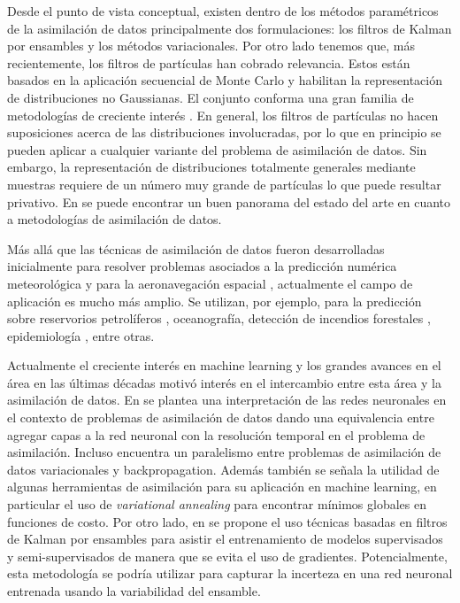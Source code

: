 Desde el punto de vista conceptual, existen dentro de los métodos paramétricos de la asimilación de datos principalmente dos formulaciones: los filtros de Kalman por ensambles y los métodos variacionales. Por otro lado tenemos que, más recientemente, los filtros de partículas han cobrado relevancia. Estos están basados en la aplicación secuencial de Monte Carlo y habilitan la representación de distribuciones no Gaussianas. El conjunto conforma una gran familia de metodologías de creciente interés \citep{vanLeeuwen2019}. En general, los filtros de partículas no hacen suposiciones acerca de las distribuciones involucradas, por lo que en principio se pueden aplicar a cualquier variante del problema de asimilación de datos. Sin embargo, la representación de distribuciones totalmente generales mediante muestras requiere de un número muy grande de partículas lo que puede resultar privativo. En \cite{Carrassi2018} se puede encontrar un buen panorama del estado del arte en cuanto a metodologías de asimilación de datos.

Más allá que las técnicas de asimilación de datos fueron desarrolladas inicialmente para resolver problemas asociados a la predicción numérica meteorológica y para la aeronavegación espacial \citep{Grewal2010}, actualmente el campo de aplicación es mucho más amplio. Se utilizan, por ejemplo, para la predicción sobre reservorios petrolíferos \cite{Aanonsen2009}, oceanografía, detección de incendios forestales \citep{Mandel2008}, epidemiología \citep{Shaman2012}, entre otras.

Actualmente el creciente interés en machine learning y los grandes avances en el área en las últimas décadas motivó interés en el intercambio entre esta área y la asimilación de datos. En \cite{Abarbanel2018} se plantea una interpretación de las redes neuronales en el contexto de problemas de asimilación de datos dando una equivalencia entre agregar capas a la red neuronal con la resolución temporal en el problema de asimilación. Incluso encuentra un paralelismo entre problemas de asimilación de datos variacionales y backpropagation. Además también se señala la utilidad de algunas herramientas de asimilación para su aplicación en machine learning, en particular el uso de \textit{variational annealing} para encontrar mínimos globales en funciones de costo. Por otro lado, en \cite{Kovachki2019} se propone el uso técnicas basadas en filtros de Kalman por ensambles para asistir el entrenamiento de modelos supervisados y semi-supervisados de manera que se evita el uso de gradientes. Potencialmente, esta metodología se podría utilizar para capturar la incerteza en una red neuronal entrenada usando la variabilidad del ensamble.

